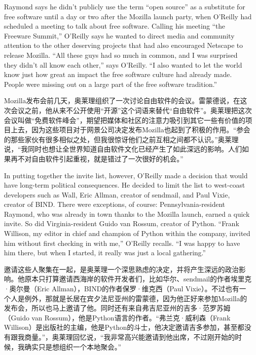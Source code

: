 \ifdefined\eng
Raymond says he didn't publicly use the term ``open source'' as a substitute for free software until a day or two after the Mozilla launch party, when O'Reilly had scheduled a meeting to talk about free software. Calling his meeting ``the Freeware Summit,'' O'Reilly says he wanted to direct media and community attention to the other deserving projects that had also encouraged Netscape to release Mozilla. ``All these guys had so much in common, and I was surprised they didn't all know each other,'' says O'Reilly. ``I also wanted to let the world know just how great an impact the free software culture had already made. People were missing out on a large part of the free software tradition.''
\fi

\ifdefined\chs
Mozilla发布会前几天，奥莱理组织了一次讨论自由软件的会议。雷蒙德说，在这次会议之前，他从来不公开使用``开源''这个词语来替代``自由软件''。奥莱理把这次会议叫做``免费软件峰会''，期望把媒体和社区的注意力吸引到其它一些有价值的项目上去，因为这些项目对于网景公司决定发布Mozilla也起到了积极的作用。``参会的那些家伙有很多相似之处，但我很惊讶他们之前互相之间都不认识。''奥莱理说，``我同时也想让全世界知道自由软件文化已经产生了如此深远的影响。人们如果再不对自由软件引起重视，就是错过了一次很好的机会。''
\fi

\ifdefined\eng
In putting together the invite list, however, O'Reilly made a decision that would have long-term political consequences. He decided to limit the list to west-coast developers such as Wall, Eric Allman, creator of sendmail, and Paul Vixie, creator of BIND. There were exceptions, of course: Pennsylvania-resident Raymond, who was already in town thanks to the Mozilla launch, earned a quick invite. So did Virginia-resident Guido van Rossum, creator of Python. ``Frank Willison, my editor in chief and champion of Python within the company, invited him without first checking in with me,'' O'Reilly recalls. ``I was happy to have him there, but when I started, it really was just a local gathering.''
\fi

\ifdefined\chs
邀请这些人聚集在一起，是奥莱理一个深思熟虑的决定，并将产生深远的政治影响。他原本只打算邀请西海岸的软件开发者们，比如华尔、sendmail的作者埃里克·奥尔曼（Eric Allman），BIND的作者保罗·维克西（Paul Vixie）。不过也有一个人是例外，那就是长居在宾夕法尼亚州的雷蒙德，因为他正好来参加Mozilla的发布会，所以也马上邀请了他。同时还有来自弗吉尼亚州的吉多·范罗苏姆（Guido van Rossum），他是Python语言的作者。``弗兰克·威利森（Frank Willison）是出版社的主编，他是Python的斗士，他决定邀请吉多参加，甚至都没有跟我商量。''，奥莱理回忆说，``我非常高兴能邀请到他出席，不过刚开始的时候，我确实只是想组织一个本地聚会。''
\fi

